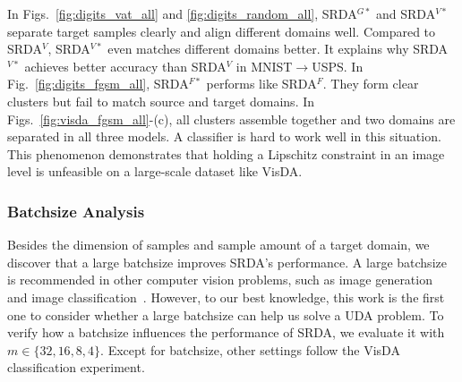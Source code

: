 \documentclass[journal,twocolumn]{IEEEtran}
\theoremstyle{definition}
\begin{document}
In Figs.~\ref{fig:digits_vat_all} and \ref{fig:digits_random_all}, SRDA$^{G*}$ and SRDA$^{V*}$ separate target samples clearly and align different domains well. Compared to SRDA$^V$, SRDA$^{V*}$ even matches different domains better. It explains why SRDA$^{V*}$ achieves better accuracy than SRDA$^V$ in MNIST$\rightarrow$USPS. In Fig.~\ref{fig:digits_fgsm_all}, SRDA$^{F*}$ performs like SRDA$^F$. They form clear clusters but fail to match source and target domains. In Figs.~\ref{fig:visda_fgsm_all}-(c), all clusters assemble together and two domains are separated in all three models. A classifier is hard to work well in this situation. This phenomenon demonstrates that holding a Lipschitz constraint in an image level is unfeasible on a large-scale dataset like VisDA.

\subsubsection{Batchsize Analysis}
\label{batchsize_exp}

Besides the dimension of samples and sample amount of a target domain,  we discover that a large batchsize improves SRDA's performance. A large batchsize is recommended in other computer vision problems, such as image generation~\cite{brock2018large} and image classification~\cite{He_2019_CVPR}. However, to our best knowledge, this work is the first one to consider whether a large batchsize can help us solve a UDA problem. To verify how a batchsize influences the performance of SRDA, we evaluate it with $m\in\{32, 16, 8, 4\}$. Except for batchsize, other settings follow the VisDA classification experiment.
\end{document}
